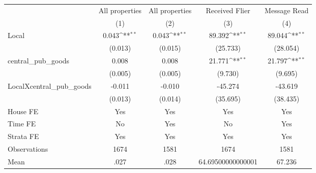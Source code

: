 {
\def\sym#1{\ifmmode^{#1}\else\(^{#1}\)\fi}
\begin{tabular}{l*{4}{c}}
\hline\hline
                &\multicolumn{1}{c}{All properties}&\multicolumn{1}{c}{All properties}&\multicolumn{1}{c}{Received Flier}&\multicolumn{1}{c}{Message Read}\\
                &\multicolumn{1}{c}{(1)}         &\multicolumn{1}{c}{(2)}         &\multicolumn{1}{c}{(3)}         &\multicolumn{1}{c}{(4)}         \\
\hline
Local           &    0.043\sym{**} &    0.043\sym{**} &   89.392\sym{**} &   89.044\sym{**} \\
                &  (0.013)         &  (0.015)         & (25.733)         & (28.054)         \\
central\_pub\_goods&    0.008         &    0.008         &   21.771\sym{**} &   21.797\sym{**} \\
                &  (0.005)         &  (0.005)         &  (9.730)         &  (9.695)         \\
LocalXcentral\_pub\_goods&   -0.011         &   -0.010         &  -45.274         &  -43.619         \\
                &  (0.013)         &  (0.014)         & (35.695)         & (38.435)         \\
House FE        &      Yes         &      Yes         &      Yes         &      Yes         \\
Time FE         &       No         &      Yes         &       No         &      Yes         \\
Strata FE       &      Yes         &      Yes         &      Yes         &      Yes         \\
\hline
Observations    &     1674         &     1581         &     1674         &     1581         \\
Mean            &     .027         &     .028         &64.69500000000001         &   67.236         \\
\hline\hline
\end{tabular}
}
